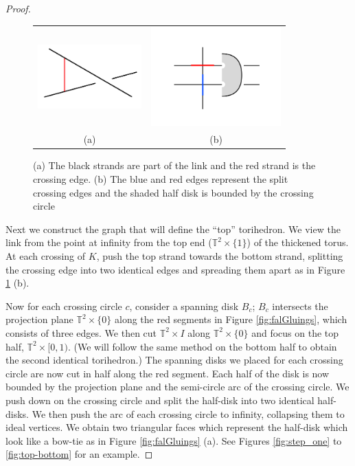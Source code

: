 \documentclass[11pt]{amsart}
\newcommand{\torus}{{\mathbb{T}^2}}
\theoremstyle{plain}
\theoremstyle{definition}
\begin{document}
\begin{proof}
\begin{figure} 
\centering 
\begin{tabular}{cc}
\includegraphics[width=4cm]{crossingArc.png}
& \includegraphics[width=5cm]{crossingPush.png}
\\
(a)
& (b)
\end{tabular}
\caption{(a) The black strands are
part of the link and the red strand is the crossing edge.
(b) The blue and
red edges represent the split crossing edges and the shaded half disk is bounded
by the crossing circle} 
\label{fig:crossingArc} 
\end{figure}


Next we construct the graph that will define the ``top'' torihedron.
We view the link from the point at infinity from the top end
($\torus \times \{1\}$) of the thickened torus.
At each crossing of $K$,
push the top strand towards the bottom strand,
splitting the crossing edge into two
identical edges and spreading them apart
as in Figure \ref{fig:crossingArc} (b).
 

Now for each crossing circle $c$, consider a spanning disk $B_c$;
$B_c$ intersects the projection plane $\torus \times \{0\}$
along the red segments in Figure \ref{fig:falGluings},
which consists of three edges.
We then cut $\torus \times I$ along $\torus \times \{0\}$ and
focus on the top half, $\torus \times [0,1)$.
(We will follow the same method on the
bottom half to obtain the second identical torihedron.)
The spanning disks we placed for each crossing circle are now cut in half
along the red segment.
Each half of the disk is now bounded by the
projection plane and the semi-circle arc of the crossing circle.
We push down on the crossing circle and split the half-disk into
two identical half-disks.
We then push the arc of each crossing circle to infinity,
collapsing them to ideal vertices.
We obtain two triangular faces which represent the half-disk which look like a
bow-tie as in Figure \ref{fig:falGluings} (a).
See Figures \ref{fig:step_one} to \ref{fig:top-bottom}
for an example.



\end{proof}
\end{document}
